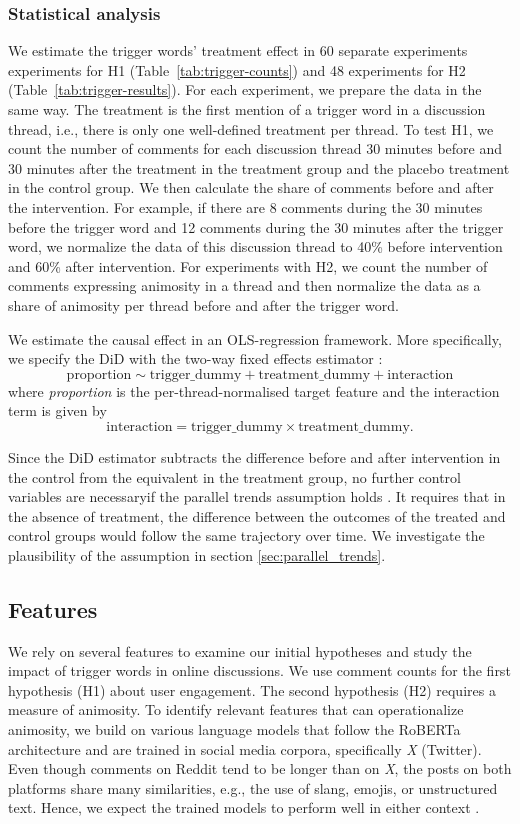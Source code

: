 \subsubsection{Statistical analysis}
We estimate the trigger words' treatment effect in 60 separate experiments experiments for H1 (Table~\ref{tab:trigger-counts}) and 48 experiments for H2 (Table~\ref{tab:trigger-results}). For each experiment, we prepare the data in the same way. The treatment is the first mention of a trigger word in a discussion thread, i.e., there is only one well-defined treatment per thread. 
To test H1, we count the number of comments for each discussion thread 30 minutes before and 30 minutes after the treatment in the treatment group and the placebo treatment in the control group. We then calculate the share of comments before and after the intervention. For example, if there are 8 comments during the 30 minutes before the trigger word and 12 comments during the 30 minutes after the trigger word, we normalize the data of this discussion thread to 40\% before intervention and 60\% after intervention. For experiments with H2, we count the number of comments expressing animosity in a thread and then normalize the data as a share of animosity per thread before and after the trigger word.

We estimate the causal effect in an OLS-regression framework. More specifically, we specify the DiD with the two-way fixed effects estimator \cite{angrist2009mostly}:
\[
\text{proportion} \sim \text{trigger\_dummy} + \text{treatment\_dummy} + \text{interaction}
\] where \textit{proportion} is the per-thread-normalised target feature and the interaction term is given by
\[
\text{interaction} = \text{trigger\_dummy} \times \text{treatment\_dummy}.
\]

Since the DiD estimator subtracts the difference before and after intervention in the control from the equivalent in the treatment group, no further control variables are necessary\textemdash if the parallel trends assumption holds \cite{roth2023s}. It requires that in the absence of treatment, the difference between the outcomes of the treated and control groups would follow the same trajectory over time. We investigate the plausibility of the assumption in section \ref{sec:parallel_trends}.

\subsection{Features} \label{sec:features}
We rely on several features to examine our initial hypotheses and study the impact of trigger words in online discussions. We use comment counts for the first hypothesis (H1) about user engagement. The second hypothesis (H2) requires a measure of animosity. To identify relevant features that can operationalize animosity, we build on various language models that follow the RoBERTa architecture \cite{ROBERTA} and are trained in social media corpora, specifically \textit{X} (Twitter). Even though comments on Reddit tend to be longer than on \textit{X}, the posts on both platforms share many similarities, e.g., the use of slang, emojis, or unstructured text. Hence, we expect the trained models to perform well in either context \cite{priya2019should}. 
 

